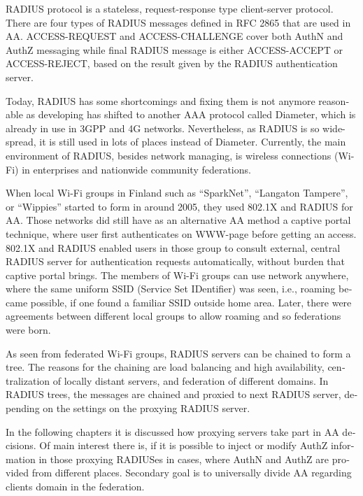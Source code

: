 \documentclass[12pt,a4paper,english]{tutthesis}
\begin{document}
\begin{otherlanguage}{english}
RADIUS protocol is a stateless, request-response type client-server
protocol. 
There are four types of RADIUS messages defined in RFC 2865 that are
used in AA. ACCESS-REQUEST and ACCESS-CHALLENGE cover both AuthN and
AuthZ messaging while final RADIUS message is either
ACCESS-ACCEPT or ACCESS-REJECT, based on the
result given by the RADIUS authentication server.

Today, RADIUS has some shortcomings and fixing them is not anymore
reasonable as developing has shifted to another AAA protocol called
Diameter, which is already in use in 3GPP and 4G
networks\cite{diameter}.  Nevertheless, as RADIUS is so wide-spread,
it is still used in lots of places instead of Diameter.  Currently,
the main environment of RADIUS, besides network managing, is wireless
connections (Wi-Fi) in enterprises and nationwide community
federations.


When local Wi-Fi groups in Finland such as ``SparkNet'', ``Langaton
Tampere'', or ``Wippies'' started to form in around 2005, they used
802.1X and RADIUS for AA. Those networks did still have as an
alternative AA method a captive portal technique, where user
first authenticates on WWW-page before getting an access.  802.1X and
RADIUS enabled users in those group to consult external,
central RADIUS server for authentication requests automatically,
without burden that captive portal brings.  The members of Wi-Fi
groups can use network anywhere, where the same uniform SSID (Service
Set IDentifier) was seen, i.e., roaming
became possible, if one found a familiar SSID outside home area.  Later, there were agreements between different local groups
to allow roaming and so federations were born.

As seen from federated Wi-Fi groups, RADIUS servers can be chained to
form a tree. The reasons for the chaining are load balancing and high
availability, centralization of locally distant servers, and
federation of different domains. In RADIUS trees, the messages are
chained and proxied to next RADIUS server, depending on the settings
on the proxying RADIUS server.


In the following chapters it is discussed how proxying servers take 
part in AA decisions. Of main interest there is, if it is possible 
to inject or modify AuthZ information in those proxying RADIUSes in
cases, where AuthN and AuthZ are provided from different
 places\cite{rfc2607}. Secondary goal is to universally divide AA regarding 
clients domain in the federation.





\end{otherlanguage}
\end{document}
